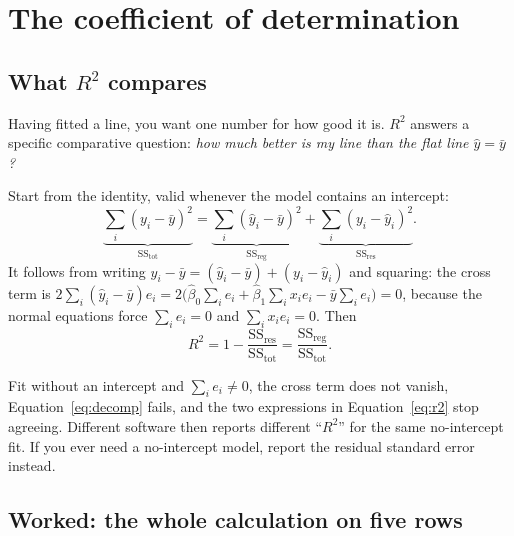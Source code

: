 \documentclass[11pt]{article}
\begin{document}
\section{The coefficient of determination}
\label{sec:r2}

\subsection{What $R^2$ compares}

Having fitted a line, you want one number for how good it is. $R^2$ answers a
specific comparative question: \emph{how much better is my line than the flat
line $\hat y = \bar y$?}

Start from the identity, valid whenever the model contains an intercept:
\begin{equation}
  \underbrace{\sum_i (y_i - \bar y)^2}_{\mathrm{SS_{tot}}}
  =
  \underbrace{\sum_i (\hat y_i - \bar y)^2}_{\mathrm{SS_{reg}}}
  +
  \underbrace{\sum_i (y_i - \hat y_i)^2}_{\mathrm{SS_{res}}} .
  \label{eq:decomp}
\end{equation}
It follows from writing $y_i - \bar y = (\hat y_i - \bar y) + (y_i - \hat y_i)$
and squaring: the cross term is
$2\sum_i (\hat y_i - \bar y)e_i = 2\bigl(\hat\beta_0\sum_i e_i +
\hat\beta_1 \sum_i x_i e_i - \bar y \sum_i e_i\bigr) = 0$, because the normal
equations force $\sum_i e_i = 0$ and $\sum_i x_i e_i = 0$. Then
\begin{equation}
  R^2 = 1 - \frac{\mathrm{SS_{res}}}{\mathrm{SS_{tot}}}
      = \frac{\mathrm{SS_{reg}}}{\mathrm{SS_{tot}}} .
  \label{eq:r2}
\end{equation}

\begin{caution}
Fit without an intercept and $\sum_i e_i \ne 0$, the cross term does not
vanish, Equation~\eqref{eq:decomp} fails, and the two expressions in
Equation~\eqref{eq:r2} stop agreeing. Different software then reports
different ``$R^2$'' for the same no-intercept fit. If you ever need a
no-intercept model, report the residual standard error instead.
\end{caution}

\subsection{Worked: the whole calculation on five rows}
\label{sec:r2hand}
\end{document}
